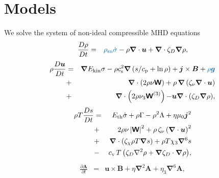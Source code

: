 \documentclass[iop,apj,numberedappendix,twocolappendix]{emulateapj}
\newcommand{\fg}[1]{\textcolor{midblue}{#1}}
\newcommand{\mathbfss}[1]{\textbf{\textsf{#1}}}
\newcommand\ESK{E_{\rm kin}}
\newcommand\EST{E_{\rm th}}
\newcommand{\vect}[1]{\boldsymbol{#1}}
\begin{document}
\section[]{Models}
\label{sect:models}
 We solve the system of non-ideal compressible MHD equations
  \begin{eqnarray}
  \label{eq:mass}
    \frac{D\rho}{Dt} &=& \fg{\rho_{\rm sn}\dot\sigma}
    -\rho \vect\nabla \cdot \vect{u}
    +\vect\nabla \cdot\zeta_D\vect\nabla\rho,
  \end{eqnarray}
  \begin{eqnarray}
  \label{eq:mom}
    \rho\frac{D\vect{u}}{Dt} &=& 
    \vect\nabla{\ESK\sigma}
    -\rho c_{\rm s}^2\vect\nabla\left({s}/{c_{\rm p}}+\ln\rho\right)
    +\vect{j}\times\vect{B} + \fg{\rho\vect{g}}
    \nonumber\\
    &+&\vect\nabla\cdot \left(2\rho\nu{\mathbfss W}\right)
    +\rho\,\vect\nabla\left(\zeta_{\nu}\vect\nabla \cdot \vect{u} \right)
    \nonumber\\
    &+&\vect\nabla\cdot \left(2\rho\nu_3{\mathbfss W}^{(3)}\right)
  {-\vect u\vect{\nabla}\cdot\left(\zeta_D\vect{\nabla}\rho\right)},
  \end{eqnarray}
  \begin{eqnarray}
  \label{eq:ent}
    \rho T\frac{D s}{Dt} &=&
     \EST\dot\sigma +\rho\Gamma
    -\rho^2\Lambda +\eta\mu_0\vect{j}^2 
    \nonumber\\
    &+&2 \rho \nu\left|{\mathbfss W}\right|^{2}
    +\rho\,\zeta_{\nu}\left(\vect\nabla \cdot \vect{u} \right)^2
    \nonumber\\
    &+&\vect\nabla\cdot\left(\zeta_\chi\rho T\vect\nabla s\right)
    +\rho T\chi_3\vect\nabla^6 s
    \nonumber\\
    &-& {c_{\rm{v}}\,T \left(
    \zeta_D\nabla^2\rho + \vect\nabla\zeta_D\cdot\vect\nabla\rho\right)},
  \end{eqnarray}
  \begin{eqnarray}
  \label{eq:ind}
    \frac{\partial \vect{A}}{\partial t} &=&
    \vect{u}\times\vect{B}
    +\eta\vect\nabla^2\vect{A}
    +\eta_3\vect\nabla^6\vect{A},
  \end{eqnarray}
\end{document}
